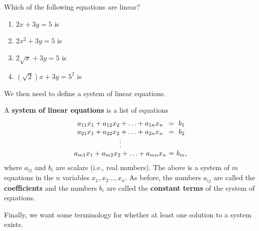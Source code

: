 \documentclass{ximera}
\begin{document}
\begin{example}
    \begin{example}\label{exa:linear-vs-non-linear}

      Which of the following equations are linear?
        \begin{enumerate}
          \item $2x+3y=5$ is 
          \item $2x^2+3y=5$  is 
          \item $2\sqrt{x} + 3y = 5$  is 
          \item $(\sqrt{2}) x + 3y = 5^2$ is 
        \end{enumerate}
    \end{example}

    We then need to define a system of linear equations.

    \begin{definition}

      A \textbf{system of linear equations}%
       is a list of equations
      \begin{equation*}
        \begin{array}{c@{~}c@{~}c}
          a_{11}x_1+a_{12}x_2+\ldots+a_{1n}x_n&=&b_1 \\
          a_{21}x_1+a_{22}x_2+\ldots+a_{2n}x_n&=&b_2 \\
          \vdots \\
          a_{m1}x_1+a_{m2}x_2+\ldots+a_{mn}x_n&=&b_m,
        \end{array}
      \end{equation*}
      where $a_{ij}$ and $b_i$ are scalars (i.e., real numbers). The above
      is a system of $m$ equations in the $n$ variables
      $x_1,x_2\ldots,x_n$.  As before, the numbers $a_{ij}$ are called the
      \textbf{coefficients}%
       and the numbers $b_i$ are called the
      \textbf{constant terms}%
       of the system of equations.
    \end{definition}

    Finally, we want some terminology for whether at least one solution to a system exists.

    \begin{definition}


\end{definition}
\end{example}
\end{document}

